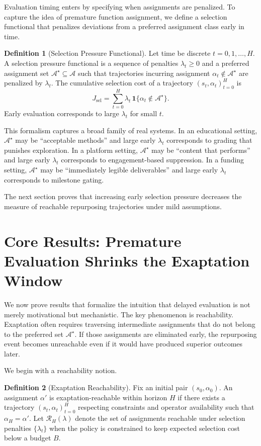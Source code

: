 \documentclass[11pt]{article}
\theoremstyle{definition}
\newtheorem{definition}{Definition}
\begin{document}
Evaluation timing enters by specifying when assignments are penalized. To capture the idea of premature function assignment, we define a selection functional that penalizes deviations from a preferred assignment class early in time.

\begin{definition}[Selection Pressure Functional]
Let time be discrete $t=0,1,\dots,H$. A selection pressure functional is a sequence of penalties $\lambda_t\ge 0$ and a preferred assignment set $\mathcal{A}^\star\subseteq \mathcal{A}$ such that trajectories incurring assignment $\alpha_t\notin\mathcal{A}^\star$ are penalized by $\lambda_t$. The cumulative selection cost of a trajectory $(s_t,\alpha_t)_{t=0}^H$ is
\[
J_{\mathrm{sel}}=\sum_{t=0}^{H} \lambda_t \,\mathbf{1}\{\alpha_t\notin \mathcal{A}^\star\}.
\]
Early evaluation corresponds to large $\lambda_t$ for small $t$.
\end{definition}

This formalism captures a broad family of real systems. In an educational setting, $\mathcal{A}^\star$ may be ``acceptable methods'' and large early $\lambda_t$ corresponds to grading that punishes exploration. In a platform setting, $\mathcal{A}^\star$ may be ``content that performs'' and large early $\lambda_t$ corresponds to engagement-based suppression. In a funding setting, $\mathcal{A}^\star$ may be ``immediately legible deliverables'' and large early $\lambda_t$ corresponds to milestone gating.

The next section proves that increasing early selection pressure decreases the measure of reachable repurposing trajectories under mild assumptions.

\section{Core Results: Premature Evaluation Shrinks the Exaptation Window}

We now prove results that formalize the intuition that delayed evaluation is not merely motivational but mechanistic. The key phenomenon is reachability. Exaptation often requires traversing intermediate assignments that do not belong to the preferred set $\mathcal{A}^\star$. If those assignments are eliminated early, the repurposing event becomes unreachable even if it would have produced superior outcomes later.

We begin with a reachability notion.

\begin{definition}[Exaptation Reachability]
Fix an initial pair $(s_0,\alpha_0)$. An assignment $\alpha'$ is exaptation-reachable within horizon $H$ if there exists a trajectory $(s_t,\alpha_t)_{t=0}^{H}$ respecting constraints and operator availability such that $\alpha_H=\alpha'$. Let $\mathcal{R}_H(\lambda)$ denote the set of assignments reachable under selection penalties $\{\lambda_t\}$ when the policy is constrained to keep expected selection cost below a budget $B$.
\end{definition}
\end{document}
